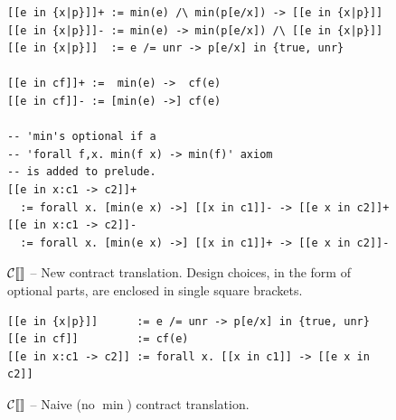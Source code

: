 \documentclass[preprint]{sigplanconf}
\begin{document}
\begin{figure}
\begin{verbatim}
[[e in {x|p}]]+ := min(e) /\ min(p[e/x]) -> [[e in {x|p}]]
[[e in {x|p}]]- := min(e) -> min(p[e/x]) /\ [[e in {x|p}]]
[[e in {x|p}]]  := e /= unr -> p[e/x] in {true, unr}

[[e in cf]]+ :=  min(e) ->  cf(e)
[[e in cf]]- := [min(e) ->] cf(e)

-- 'min's optional if a
-- 'forall f,x. min(f x) -> min(f)' axiom
-- is added to prelude.
[[e in x:c1 -> c2]]+
  := forall x. [min(e x) ->] [[x in c1]]- -> [[e x in c2]]+   
[[e in x:c1 -> c2]]-
  := forall x. [min(e x) ->] [[x in c1]]+ -> [[e x in c2]]-
\end{verbatim}
\caption{$\mathcal{C} \llbracket  \rrbracket$ -- New contract translation. Design choices, in the form
of optional parts, are enclosed in single square brackets.}
\label{fig:newCTrans}
\end{figure}

\begin{figure}
\begin{verbatim}
[[e in {x|p}]]      := e /= unr -> p[e/x] in {true, unr}
[[e in cf]]         := cf(e)
[[e in x:c1 -> c2]] := forall x. [[x in c1]] -> [[e x in c2]]
\end{verbatim}
\caption{$\mathcal{C} \llbracket  \rrbracket$ -- Naive (no $\min$) contract translation.}
\label{fig:naiveCTrans}
\end{figure}
\end{document}
